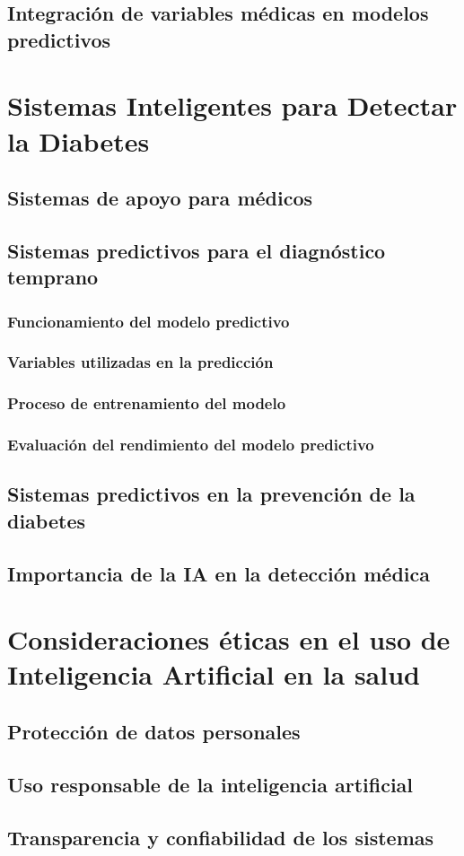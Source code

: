 \subsection{Integraci\'on de variables m\'edicas en modelos predictivos}

\section{Sistemas Inteligentes para Detectar la Diabetes}

\subsection{Sistemas de apoyo para m\'edicos}

\subsection{Sistemas predictivos para el diagn\'ostico temprano}
\subsubsection{Funcionamiento del modelo predictivo}
\subsubsection{Variables utilizadas en la predicci\'on}
\subsubsection{Proceso de entrenamiento del modelo}
\subsubsection{Evaluaci\'on del rendimiento del modelo predictivo}

\subsection{Sistemas predictivos en la prevenci\'on de la diabetes}

\subsection{Importancia de la IA en la detecci\'on m\'edica}

\section{Consideraciones \'eticas en el uso de Inteligencia Artificial en la salud}

\subsection{Protecci\'on de datos personales}
\subsection{Uso responsable de la inteligencia artificial}
\subsection{Transparencia y confiabilidad de los sistemas}